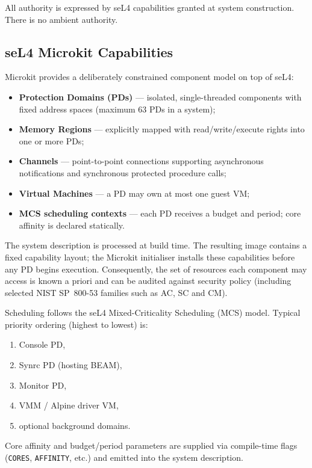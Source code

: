 \documentclass{article}
\begin{document}
All authority is expressed by seL4 capabilities granted at system construction. There is no ambient authority.

\newpage
\subsection{seL4 Microkit Capabilities}
\label{sec:microkit}

Microkit provides a deliberately constrained component model on top of seL4:

\begin{itemize}
  \item \textbf{Protection Domains (PDs)} --- isolated, single-threaded components with fixed address spaces (maximum 63 PDs in a system);
  \item \textbf{Memory Regions} --- explicitly mapped with read/write/execute rights into one or more PDs;
  \item \textbf{Channels} --- point-to-point connections supporting asynchronous notifications and synchronous protected procedure calls;
  \item \textbf{Virtual Machines} --- a PD may own at most one guest VM;
  \item \textbf{MCS scheduling contexts} --- each PD receives a budget and period; core affinity is declared statically.
\end{itemize}

The system description is processed at build time. The resulting image contains a fixed capability layout; the Microkit initialiser installs these capabilities before any PD begins execution. Consequently, the set of resources each component may access is known a priori and can be audited against security policy (including selected NIST SP~800-53 families such as AC, SC and CM).

Scheduling follows the seL4 Mixed-Criticality Scheduling (MCS) model. Typical priority ordering (highest to lowest) is:

\begin{enumerate}
  \item Console PD,
  \item Synrc PD (hosting BEAM),
  \item Monitor PD,
  \item VMM / Alpine driver VM,
  \item optional background domains.
\end{enumerate}

Core affinity and budget/period parameters are supplied via compile-time flags (\texttt{CORES}, \texttt{AFFINITY}, etc.)
and emitted into the system description.
\end{document}
